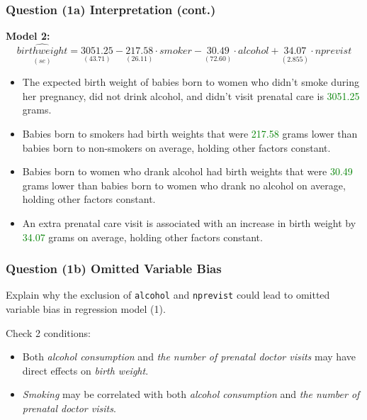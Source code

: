 \documentclass[11pt, xcolor=x11names,compress]{beamer}
\begin{document}
\begin{frame}[fragile,t]
\frametitle{Question (1a) Interpretation (cont.)} 
\textbf{Model 2:} 
\begin{equation*}
    \underset{(se)}{\widehat{birthweight}} = \underset{(43.71)}{3051.25} - \underset{(26.11)}{217.58} \cdot smoker - \underset{(72.60)}{30.49}\cdot alcohol + 
    \underset{(2.855)}{34.07}\cdot nprevist
\end{equation*}
\begin{itemize}
\item The expected birth weight of babies born to women who didn’t smoke during her pregnancy, did not drink alcohol, and didn’t visit prenatal care is \textcolor{green}{3051.25} grams.
\item Babies born to smokers had birth weights that were \textcolor{green}{217.58} grams lower than babies born to non-smokers on average, holding other factors constant.
\item Babies born to women who drank alcohol had birth weights that were \textcolor{green}{30.49} grams lower than babies born to women who drank no alcohol on average, holding other factors constant.
\item An extra prenatal care visit is associated with an increase in birth weight by \textcolor{green}{34.07} grams on average, holding other factors constant.
\end{itemize}
\end{frame}

\begin{frame}[fragile,t]
\frametitle{Question (1b) Omitted Variable Bias} \label{OVBb}
Explain why the exclusion of \texttt{alcohol} and \texttt{nprevist} could lead to omitted variable bias in regression model (1).\\
\hyperlink{OVB}{}
\pause

\vspace{3mm}

Check 2 conditions:
\begin{itemize}
    \item Both \textit{alcohol consumption} and \textit{the number of prenatal doctor visits} may have direct effects on \textit{birth weight}.
    \item \textit{Smoking} may be correlated with both \textit{alcohol consumption} and \textit{the number of prenatal doctor visits}. 
\end{itemize}
\end{frame}
\end{document}
